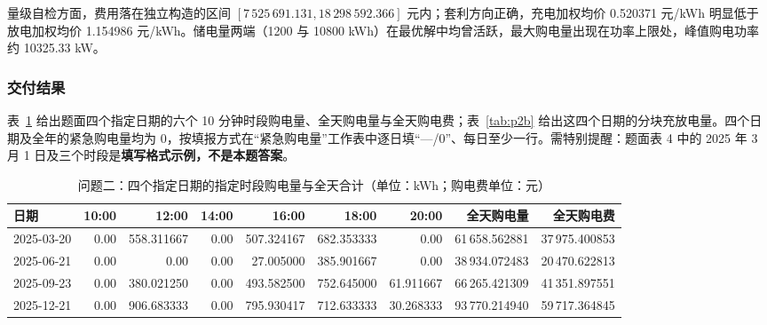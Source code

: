 量级自检方面，费用落在独立构造的区间 $[7\,525\,691.131,18\,298\,592.366]$ 元内；套利方向正确，充电加权均价 0.520371 元/kWh 明显低于放电加权均价 1.154986 元/kWh。储电量两端（1200 与 10800 kWh）在最优解中均曾活跃，最大购电量出现在功率上限处，峰值购电功率约 10325.33 kW。

\subsubsection{交付结果}

表~\ref{tab:p2a} 给出题面四个指定日期的六个 10 分钟时段购电量、全天购电量与全天购电费；表~\ref{tab:p2b} 给出这四个日期的分块充放电量。四个日期及全年的紧急购电量均为 0，按填报方式在“紧急购电量”工作表中逐日填“—/0”、每日至少一行。需特别提醒：题面表 4 中的 2025 年 3 月 1 日及三个时段是\textbf{填写格式示例，不是本题答案}。

\begin{table}[htbp]
\centering
\small
\caption{问题二：四个指定日期的指定时段购电量与全天合计（单位：kWh；购电费单位：元）}
\label{tab:p2a}\tighttable\begin{tabular}{lrrrrrrrr}
\toprule
日期 & 10:00 & 12:00 & 14:00 & 16:00 & 18:00 & 20:00 & 全天购电量 & 全天购电费 \\
\midrule
2025-03-20 & 0.00 & 558.311667 & 0.00 & 507.324167 & 682.353333 & 0.00 & 61\,658.562881 & 37\,975.400853 \\
2025-06-21 & 0.00 & 0.00 & 0.00 & 27.005000 & 385.901667 & 0.00 & 38\,934.072483 & 20\,470.622813 \\
2025-09-23 & 0.00 & 380.021250 & 0.00 & 493.582500 & 752.645000 & 61.911667 & 66\,265.421309 & 41\,351.897551 \\
2025-12-21 & 0.00 & 906.683333 & 0.00 & 795.930417 & 712.633333 & 30.268333 & 93\,770.214940 & 59\,717.364845 \\
\bottomrule
\end{tabular}
\end{table}

